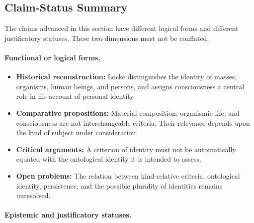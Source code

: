 
\subsection*{Claim-Status Summary}

The claims advanced in this section have different
logical forms and different justificatory statuses.
These two dimensions must not be conflated.

\paragraph{Functional or logical forms.}

\begin{itemize}
    \item \textbf{Historical reconstruction:}
    Locke distinguishes the identity of masses,
    organisms, human beings, and persons, and
    assigns consciousness a central role in
    his account of personal identity.

    \item \textbf{Comparative propositions:}
    Material composition, organismic life, and
    consciousness are not interchangeable
    criteria. Their relevance depends upon
    the kind of subject under consideration.

    \item \textbf{Critical arguments:}
    A criterion of identity must not be
    automatically equated with the ontological
    identity it is intended to assess.

    \item \textbf{Open problems:}
    The relation between kind-relative criteria,
    ontological identity, persistence, and the
    possible plurality of identities remains
    unresolved.
\end{itemize}

\paragraph{Epistemic and justificatory statuses.}


